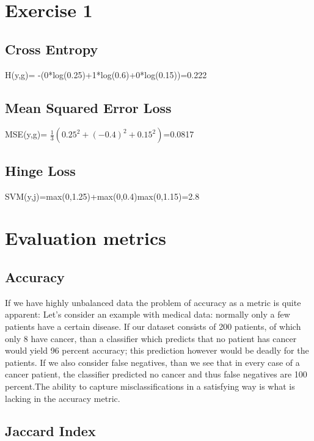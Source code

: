 \documentclass[10pt]{article}
\begin{document}
\section{Exercise 1}
\subsection{Cross Entropy}
H(y,g)= -(0*log(0.25)+1*log(0.6)+0*log(0.15))=0.222
\subsection{Mean Squared Error Loss}
MSE(y,g)= $\frac{1}{3}(0.25^2+(-0.4)^2+0.15^2)$=0.0817
\subsection{Hinge Loss}
SVM(y,j)=max(0,1.25)+max(0,0.4)max(0,1.15)=2.8

\section{Evaluation metrics}
\subsection{Accuracy}
If we have highly unbalanced data the problem of accuracy as a metric is quite apparent: Let's consider an example with medical data: normally only a few patients have a certain disease. If our dataset consists of 200 patients, of which only 8 have cancer, than a classifier which predicts that no patient has cancer would yield 96 percent accuracy; this prediction however would be deadly for the patients. If we also consider false negatives, than we see that in every case of a cancer patient, the classifier predicted no cancer and thus false negatives are 100 percent.The ability to  capture misclassifications in a satisfying way is what is lacking in the accuracy metric.
\subsection{Jaccard Index}
   
\end{document}
